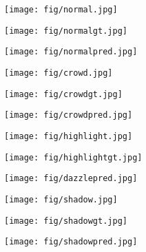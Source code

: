 \documentclass[conference]{IEEEtran}
\begin{document}
\begin{figure}
     \centering
     \begin{subfigure}[b]{0.32\linewidth}
         \centering
         \texttt{[image: fig/normal.jpg]}
\end{subfigure}\begin{subfigure}[b]{0.32\linewidth}
         \centering
         \texttt{[image: fig/normalgt.jpg]}
\end{subfigure}\begin{subfigure}[b]{0.32\linewidth}
         \centering
         \texttt{[image: fig/normalpred.jpg]}
\end{subfigure}\vspace{.3ex}
     
     \begin{subfigure}[b]{0.32\linewidth}
         \centering
         \texttt{[image: fig/crowd.jpg]}
\end{subfigure}\begin{subfigure}[b]{0.32\linewidth}
         \centering
         \texttt{[image: fig/crowdgt.jpg]}
\end{subfigure}\begin{subfigure}[b]{0.32\linewidth}
         \centering
         \texttt{[image: fig/crowdpred.jpg]}
\end{subfigure}\vspace{.3ex}
     
     \begin{subfigure}[b]{0.32\linewidth}
         \centering
         \texttt{[image: fig/highlight.jpg]}
\end{subfigure}\begin{subfigure}[b]{0.32\linewidth}
         \centering
         \texttt{[image: fig/highlightgt.jpg]}
\end{subfigure}\begin{subfigure}[b]{0.32\linewidth}
         \centering
         \texttt{[image: fig/dazzlepred.jpg]}
\end{subfigure}\vspace{.3ex}
     
     \begin{subfigure}[b]{0.32\linewidth}
         \centering
         \texttt{[image: fig/shadow.jpg]}
\end{subfigure}\begin{subfigure}[b]{0.32\linewidth}
         \centering
         \texttt{[image: fig/shadowgt.jpg]}
\end{subfigure}\begin{subfigure}[b]{0.32\linewidth}
         \centering
         \texttt{[image: fig/shadowpred.jpg]}
\end{subfigure}\vspace{.3ex}
     

\end{figure}
\end{document}
